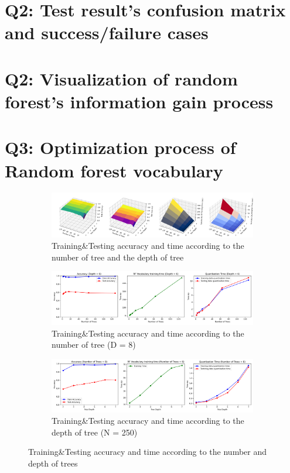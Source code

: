 \section{Q2: Test result's confusion matrix and success/failure cases}
\label{subsec:Q2-app1}

\section{Q2: Visualization of random forest's information gain process}
\label{subsec:Q2-app2}


\section{Q3: Optimization process of Random forest vocabulary}
\label{subsec:Q3-app1}
\begin{figure}[htbp]
	\centering
	\begin{subfigure}[H]{0.7\linewidth}
		\centering
		\includegraphics[width=\linewidth]{image/q3-fig1.png}
		\caption{Training\&Testing accuracy and time according to the number of tree and the depth of tree}
		\label{fig:q3-fig1}
	\end{subfigure}
	\begin{subfigure}[H]{0.7\linewidth}
		\centering
		\includegraphics[width=\linewidth]{image/q3-fig2.png}
		\caption{Training\&Testing accuracy and time according to the number of tree (D = 8)}
		\label{fig:q3-fig2}
	\end{subfigure}
	\begin{subfigure}[H]{0.7\linewidth}
		\centering
		\includegraphics[width=\linewidth]{image/q3-fig3.png}
		\caption{Training\&Testing accuracy and time according to the depth of tree (N = 250)}
		\label{fig:q3-fig3}
	\end{subfigure}
	\caption{Training\&Testing accuracy and time according to the number and depth of trees}
\end{figure}


